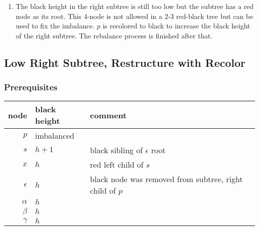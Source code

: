 \documentclass[a4paper,10pt,twoside]{article}
\begin{document}
\begin{enumerate}
\item The black height in the right subtree is still too low but the subtree
has a red node as its root. This 4-node is not allowed in a 2-3 red-black tree
but can be used to fix the imbalance. $p$ is recolored to black to increase the
black height of the right subtree. The rebalance process is finished after that.

\begin{center}
\end{center}

\end{enumerate}


\newpage
\subsection{Low Right Subtree, Restructure with Recolor}

\subsubsection{Prerequisites}

\begin{center}
\begin{tabular}{|r||l|l|}
\hline
node		&	black height	&	comment	\\
\hline
\hline
$p$		&	imbalanced	&		\\\hline
$s$		&	$h+1$	&	black sibling of $\epsilon$ root	\\\hline
$x$		&	$h$	&	red left child of $s$	\\\hline
$\epsilon$	&	$h$	&	black node was removed from subtree, right child of $p$	\\\hline
$\alpha$	&	$h$	&		\\\hline
$\beta$		&	$h$	&		\\\hline
$\gamma$	&	$h$	&		\\\hline
\end{tabular}
\end{center}
\end{document}
